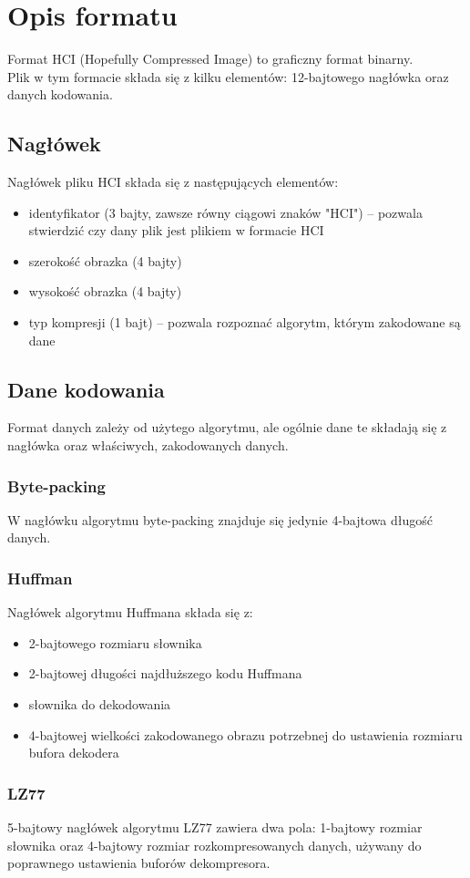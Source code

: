 \documentclass[12pt,a4paper]{article}
\begin{document}
	\section{Opis formatu}
		Format HCI (Hopefully Compressed Image) to graficzny format binarny.\\
		Plik w tym formacie składa się z kilku elementów: 12-bajtowego nagłówka oraz danych kodowania.
		\subsection{Nagłówek}
			Nagłówek pliku HCI składa się z następujących elementów:
			\begin{itemize}
				\item identyfikator (3 bajty, zawsze równy ciągowi znaków "HCI") -- pozwala stwierdzić czy dany plik jest plikiem w formacie HCI
				\item szerokość obrazka (4 bajty)
				\item wysokość obrazka (4 bajty)
				\item typ kompresji (1 bajt) -- pozwala rozpoznać algorytm, którym zakodowane są dane
			\end{itemize}
		\subsection{Dane kodowania}
			Format danych zależy od użytego algorytmu, ale ogólnie dane te składają się z nagłówka oraz właściwych, zakodowanych danych.
			\subsubsection{Byte-packing}
				W nagłówku algorytmu byte-packing znajduje się jedynie 4-bajtowa długość danych.
			\subsubsection{Huffman}
				Nagłówek algorytmu Huffmana składa się z:
				\begin{itemize}
					\item 2-bajtowego rozmiaru słownika
					\item 2-bajtowej długości najdłuższego kodu Huffmana
					\item słownika do dekodowania
					\item 4-bajtowej wielkości zakodowanego obrazu potrzebnej do ustawienia rozmiaru bufora dekodera
				\end{itemize}
			\subsubsection{LZ77}
				5-bajtowy nagłówek algorytmu LZ77 zawiera dwa pola: 1-bajtowy rozmiar słownika oraz 4-bajtowy rozmiar rozkompresowanych danych, używany do
				poprawnego ustawienia buforów dekompresora.
\end{document}
